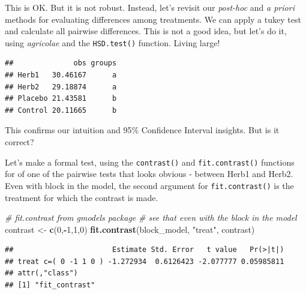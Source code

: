 \documentclass[
]{book}
\newenvironment{Shaded}{\begin{snugshade}}{\end{snugshade}}
\newcommand{\AttributeTok}[1]{\textcolor[rgb]{0.13,0.29,0.53}{#1}}
\newcommand{\CommentTok}[1]{\textcolor[rgb]{0.56,0.35,0.01}{\textit{#1}}}
\newcommand{\ConstantTok}[1]{\textcolor[rgb]{0.56,0.35,0.01}{#1}}
\newcommand{\DecValTok}[1]{\textcolor[rgb]{0.00,0.00,0.81}{#1}}
\newcommand{\FunctionTok}[1]{\textcolor[rgb]{0.13,0.29,0.53}{\textbf{#1}}}
\newcommand{\NormalTok}[1]{#1}
\newcommand{\OtherTok}[1]{\textcolor[rgb]{0.56,0.35,0.01}{#1}}
\newcommand{\SpecialCharTok}[1]{\textcolor[rgb]{0.81,0.36,0.00}{\textbf{#1}}}
\newcommand{\StringTok}[1]{\textcolor[rgb]{0.31,0.60,0.02}{#1}}
\begin{document}
This is OK. But it is not robust. Instead, let's revisit our \emph{post-hoc} and \emph{a priori} methods for evaluating differences among treatments. We can apply a tukey test and calculate all pairwise differences. This is not a good idea, but let's do it, using \emph{agricolae} and the \texttt{HSD.test()} function. Living large!

\begin{Shaded}
\end{Shaded}

\begin{verbatim}
##              obs groups
## Herb1   30.46167      a
## Herb2   29.18874      a
## Placebo 21.43581      b
## Control 20.11665      b
\end{verbatim}

This confirms our intuition and 95\% Confidence Interval insights. But is it correct?

Let's make a formal test, using the \texttt{contrast()} and \texttt{fit.contrast()} functions for of one of the pairwise tests that looks obvious - between Herb1 and Herb2. Even with block in the model, the second argument for \texttt{fit.contrast()} is the treatment for which the contrast is made.

\begin{Shaded}
\begin{Highlighting}[]
\CommentTok{\# fit.contrast from gmodels package}
\CommentTok{\# see that even with the block in the model}
\NormalTok{contrast }\OtherTok{\textless{}{-}} \FunctionTok{c}\NormalTok{(}\DecValTok{0}\NormalTok{,}\SpecialCharTok{{-}}\DecValTok{1}\NormalTok{,}\DecValTok{1}\NormalTok{,}\DecValTok{0}\NormalTok{)}
\FunctionTok{fit.contrast}\NormalTok{(block\_model, }\StringTok{"treat"}\NormalTok{, contrast)}
\end{Highlighting}
\end{Shaded}

\begin{verbatim}
##                       Estimate Std. Error   t value   Pr(>|t|)
## treat c=( 0 -1 1 0 ) -1.272934  0.6126423 -2.077777 0.05985811
## attr(,"class")
## [1] "fit_contrast"
\end{verbatim}
\end{document}
